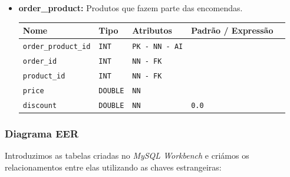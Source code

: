 \begin{itemize}
        \item \textbf{order\_product:}
        Produtos que fazem parte das encomendas. 
        \begin{table}[H]
            \centering
            \begin{tabularx}{\linewidth}{XXXXX}
            \toprule
            \textbf{\color{color_scheme}Nome} & \textbf{\color{color_scheme}Tipo} & \textbf{\color{color_scheme}Atributos} & \textbf{\color{color_scheme}Padrão / Expressão}\\
            \midrule
            \texttt{order\_product\_id} & \texttt{INT} & \texttt{PK - NN - AI} &\\
            \texttt{order\_id} & \texttt{INT}  & \texttt{NN - FK}  &  \\
            \texttt{product\_id} & \texttt{INT}  & \texttt{NN - FK}  &  \\
            \texttt{price} & \texttt{DOUBLE}  & \texttt{NN}  & \\
            \texttt{discount} & \texttt{DOUBLE}  & \texttt{NN}  & \texttt{0.0}\\
            \bottomrule
            \end{tabularx}
            \label{table: order_product}
        \end{table}

\end{itemize}

\newpage

\subsubsection{Diagrama EER}
Introduzimos as tabelas criadas no \textit{MySQL Workbench} e criámos os relacionamentos entre elas utilizando as chaves estrangeiras:

\vspace{12pt}

